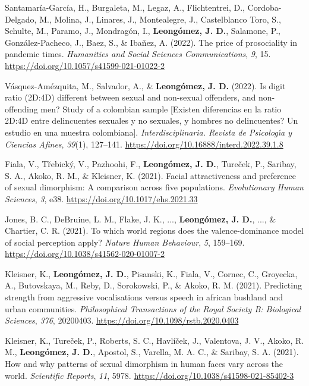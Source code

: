 \documentclass[11pt, a4paper]{awesome-cv}
\begin{document}
\leavevmode{}%
Santamaría-García, H., Burgaleta, M., Legaz, A., Flichtentrei, D.,
Cordoba-Delgado, M., Molina, J., Linares, J., Montealegre, J.,
Castelblanco Toro, S., Schulte, M., Paramo, J., Mondragón, I.,
\textbf{Leongómez, J. D.}, Salamone, P., González-Pacheco, J., Baez, S.,
\& Ibañez, A. (2022). The price of prosociality in pandemic times.
\emph{Humanities and Social Sciences Communications}, \emph{9}, 15.
\url{https://doi.org/10.1057/s41599-021-01022-2}

\leavevmode{}%
Vásquez-Amézquita, M., Salvador, A., \& \textbf{Leongómez, J. D.}
(2022). Is digit ratio (2D:4D) different between sexual and non-sexual
offenders, and non-offending men? Study of a colombian sample
{{[}Existen diferencias en la ratio 2D:4D entre delincuentes sexuales y
no sexuales, y hombres no delincuentes? Un estudio en una muestra
colombiana{]}}. \emph{Interdisciplinaria. Revista de Psicolog{ı́}a y
Ciencias Afines}, \emph{39}(1), 127--141.
\url{https://doi.org/10.16888/interd.2022.39.1.8}

\leavevmode{}%
Fiala, V., Třebický, V., Pazhoohi, F., \textbf{Leongómez, J. D.},
Tureček, P., Saribay, S. A., Akoko, R. M., \& Kleisner, K. (2021).
Facial attractiveness and preference of sexual dimorphism: A comparison
across five populations. \emph{Evolutionary Human Sciences}, \emph{3},
e38. \url{https://doi.org/10.1017/ehs.2021.33}

\leavevmode{}%
Jones, B. C., DeBruine, L. M., Flake, J. K., ...,
\textbf{Leongómez, J. D.}, ..., \& Chartier, C. R. (2021). {To which
world regions does the valence-dominance model of social perception
apply?} \emph{Nature Human Behaviour}, \emph{5}, 159--169.
\url{https://doi.org/10.1038/s41562-020-01007-2}

\leavevmode{}%
Kleisner, K., \textbf{Leongómez, J. D.}, Pisanski, K., Fiala, V.,
Cornec, C., Groyecka, A., Butovskaya, M., Reby, D., Sorokowski, P., \&
Akoko, R. M. (2021). Predicting strength from aggressive vocalisations
versus speech in african bushland and urban communities.
\emph{Philosophical Transactions of the Royal Society B: Biological
Sciences}, \emph{376}, 20200403.
\url{https://doi.org/10.1098/rstb.2020.0403}

\leavevmode{}%
Kleisner, K., Tureček, P., Roberts, S. C., Havlíček, J., Valentova, J.
V., Akoko, R. M., \textbf{Leongómez, J. D.}, Apostol, S., Varella, M. A.
C., \& Saribay, S. A. (2021). How and why patterns of sexual dimorphism
in human faces vary across the world. \emph{Scientific Reports},
\emph{11}, 5978. \url{https://doi.org/10.1038/s41598-021-85402-3}
\end{document}

